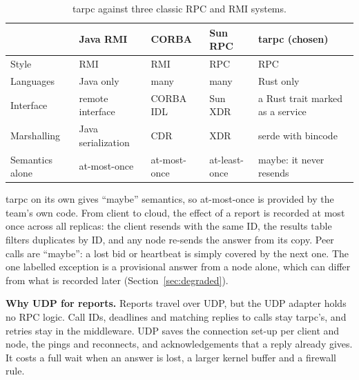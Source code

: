 \begin{table}[!htb]
\centering\small
\caption{tarpc against three classic RPC and RMI systems.}
\label{tab:rpc}
\begin{tabularx}{\linewidth}{@{}P{2.6cm}LLLL@{}}
\toprule
 & Java RMI & CORBA & Sun RPC & tarpc (chosen) \\
\midrule
Style & RMI & RMI & RPC & RPC \\
Languages & Java only & many & many & Rust only \\
Interface & remote interface & CORBA IDL & Sun XDR & a Rust trait marked as a service \\
Marshalling & Java serialization & CDR & XDR & serde with bincode \\
Semantics alone & at-most-once & at-most-once & at-least-once & maybe: it never resends \\
\bottomrule
\end{tabularx}
\end{table}

tarpc on its own gives ``maybe'' semantics, so at-most-once is provided by the team's own code. From client to cloud, the effect of a report is recorded at most once across all replicas: the client resends with the same ID, the results table filters duplicates by ID, and any node re-sends the answer from its copy. Peer calls are ``maybe'': a lost bid or heartbeat is simply covered by the next one. The one labelled exception is a provisional answer from a node alone, which can differ from what is recorded later (Section~\ref{sec:degraded}).

\textbf{Why UDP for reports.} Reports travel over UDP, but the UDP adapter holds no RPC logic. Call IDs, deadlines and matching replies to calls stay tarpc's, and retries stay in the middleware. UDP saves the connection set-up per client and node, the pings and reconnects, and acknowledgements that a reply already gives. It costs a full wait when an answer is lost, a larger kernel buffer and a firewall rule.
